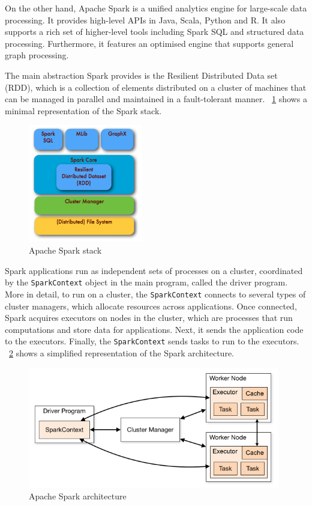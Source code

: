 \documentclass[10pt, a4paper]{report}
\begin{document}
On the other hand, Apache Spark is a unified analytics engine for large-scale data processing. It provides high-level APIs in Java, Scala, Python and R. It also supports a rich set of higher-level tools including Spark SQL and structured data processing. Furthermore, it features an optimised engine that supports general graph processing\cite{apache_spark}.

The main abstraction Spark provides is the Resilient Distributed Data set (RDD), which is a collection of elements distributed on a cluster of machines that can be managed in parallel and maintained in a fault-tolerant manner. \figurename~\ref{fig:spark_stack} shows a minimal representation of the Spark stack.

\begin{figure}
	\centering
	\includegraphics[width=5cm]{./assets/img/spark/apache_spark_stack.png}
	\caption{Apache Spark stack}
	\label{fig:spark_stack}
	\vspace{0.5cm}
\end{figure}

Spark applications run as independent sets of processes on a cluster, coordinated by the \texttt{SparkContext} object in the main program, called the driver program. More in detail, to run on a cluster, the \texttt{SparkContext} connects to several types of cluster managers, which allocate resources across applications. Once connected, Spark acquires executors on nodes in the cluster, which are processes that run computations and store data for applications. Next, it sends the application code to the executors. Finally, the \texttt{SparkContext} sends tasks to run to the executors\cite{apache_spark_architecture}. \figurename~\ref{fig:spark_architecture} shows a simplified representation of the Spark architecture.

\begin{figure}
	\centering
	\includegraphics[width=11cm]{./assets/img/spark/apache_spark_architecture.png}
	\caption{Apache Spark architecture}
	\label{fig:spark_architecture}
	\vspace{0.5cm}
\end{figure}
\end{document}

